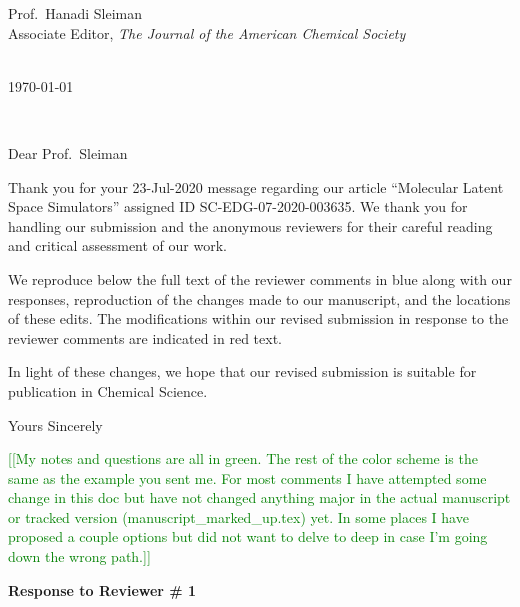 \documentclass[11pt,a4paper]{letter} %
\makeatletter
\newcommand*{\noteg}[1]{\textcolor{green}{[[#1]]}}		%
\def\opening#1{\thispagestyle{empty}
{\centering\fromaddress \vspace{1.1in} \\ %
%
\hspace*{4.15 in}\today\hspace*{\fill}\par
} %
{\raggedright \toname \\ \toaddress \par} %
\vspace{0.05in} %
\noindent #1 %
}
\makeatother
\begin{document}

\begin{letter}
{
Prof.\ Hanadi Sleiman \\
Associate Editor, \textit{The Journal of the American Chemical Society}
}


\opening{Dear Prof.\ Sleiman}

Thank you for your 23-Jul-2020 message regarding our article “Molecular Latent Space Simulators” assigned ID SC-EDG-07-2020-003635. We thank you for handling our submission and the anonymous reviewers for their careful reading and critical assessment of our work.

We reproduce below the full text of the reviewer comments in blue along with our responses, reproduction of the changes made to our manuscript, and the locations of these edits. The modifications within our revised submission in response to the reviewer comments are indicated in red text. 

In light of these changes, we hope that our revised submission is suitable for publication in Chemical Science.

\closing{Yours Sincerely}

\end{letter}


\clearpage
\newpage

\noteg{My notes and questions are all in green. The rest of the color scheme is the same as the example you sent me. For most comments I have attempted some change in this doc but have not changed anything major in the actual manuscript or tracked version (manuscript\_marked\_up.tex) yet. In some places I have proposed a couple options but did not want to delve to deep in case I'm going down the wrong path.} 

\begin{shaded}
\textbf{Response to Reviewer \# 1}
\end{shaded}
\end{document}
